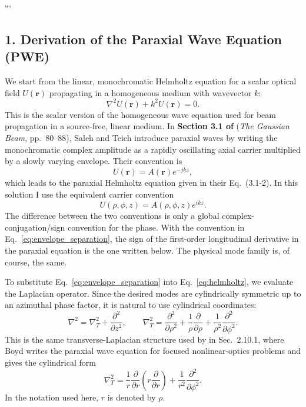 \begin{resolucao}[Solution]

```
\subsection*{1. Derivation of the Paraxial Wave Equation (PWE)}

    We start from the linear, monochromatic Helmholtz equation for a scalar optical field $U(\mathbf{r})$ propagating in a homogeneous medium with wavevector $k$:
    \begin{equation}
        \nabla^2 U(\mathbf{r}) + k^2 U(\mathbf{r}) = 0.
        \label{eq:helmholtz}
    \end{equation}
    This is the scalar version of the homogeneous wave equation used for beam propagation in a source-free, linear medium. In \textbf{Section 3.1 of } (\textit{The Gaussian Beam}, pp.~80--88), Saleh and Teich introduce paraxial waves by writing the monochromatic complex amplitude as a rapidly oscillating axial carrier multiplied by a slowly varying envelope. Their convention is
    \begin{equation}
        U(\mathbf{r}) = A(\mathbf{r})e^{-jkz},
        \tag{Saleh Eq.~3.1-1}
    \end{equation}
    which leads to the paraxial Helmholtz equation given in their Eq.~(3.1-2). In this solution I use the equivalent carrier convention
    \begin{equation}
        U(\rho,\phi,z) = A(\rho,\phi,z)e^{ikz}.
        \label{eq:envelope_separation}
    \end{equation}
    The difference between the two conventions is only a global complex-conjugation/sign convention for the phase. With the convention in Eq.~\eqref{eq:envelope_separation}, the sign of the first-order longitudinal derivative in the paraxial equation is the one written below. The physical mode family is, of course, the same.
    
    To substitute Eq.~\eqref{eq:envelope_separation} into Eq.~\eqref{eq:helmholtz}, we evaluate the Laplacian operator. Since the desired modes are cylindrically symmetric up to an azimuthal phase factor, it is natural to use cylindrical coordinates:
    \begin{equation}
        \nabla^2
        =
        \nabla_T^2
        +
        \frac{\partial^2}{\partial z^2},
        \qquad
        \nabla_T^2
        =
        \frac{\partial^2}{\partial \rho^2}
        +
        \frac{1}{\rho}
        \frac{\partial}{\partial \rho}
        +
        \frac{1}{\rho^2}
        \frac{\partial^2}{\partial \phi^2}.
        \label{eq:laplacian_cylindrical}
    \end{equation}
    This is the same transverse-Laplacian structure used by \textbf{} in Sec.~2.10.1, where Boyd writes the paraxial wave equation for focused nonlinear-optics problems and gives the cylindrical form
    \[
        \nabla_T^2
        =
        \frac{1}{r}
        \frac{\partial}{\partial r}
        \left(
            r\frac{\partial}{\partial r}
        \right)
        +
        \frac{1}{r^2}
        \frac{\partial^2}{\partial\phi^2}.
    \]
    In the notation used here, $r$ is denoted by $\rho$.


\end{resolucao}
